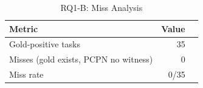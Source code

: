 \begin{table}[t]
\centering
\caption{RQ1-B: Miss Analysis}
\label{tab:rq1_miss}
\begin{tabular}{lrr}
\toprule
Metric & Value \\
\midrule
Gold-positive tasks & 35 \\
Misses (gold exists, PCPN no witness) & 0 \\
Miss rate & 0/35 \\
\bottomrule
\end{tabular}
\end{table}
